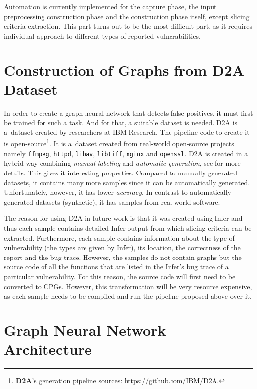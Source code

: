 Automation is currently implemented for the capture phase, the input preprocessing
construction phase and the construction phase itself, except slicing criteria
extraction. This part turns out to be the most difficult part, as it requires individual
approach to different types of reported vulnerabilities.


\section{Construction of Graphs from D2A Dataset}
\label{d2a}

In order to create a graph neural network that detects false positives, it must first be trained for such a task. And for that, a suitable dataset is needed. D2A \cite{D2A-zheng2021d2a} is a~dataset created by researchers at IBM Research. The pipeline code to create it is open-source\footnote{\textbf{D2A}'s generation pipeline sources: \url{https://github.com/IBM/D2A}.}. It is a~dataset created from real-world open-source projects \cite{D2A-webpage} namely \texttt{ffmpeg}, \texttt{httpd}, \texttt{libav}, \texttt{libtiff}, \texttt{nginx} and \texttt{openssl}. D2A is created in a hybrid way combining \textit{manual labeling} and \textit{automatic generation}, see \cite{D2A-zheng2021d2a} for more details. This gives it interesting properties. Compared to manually generated datasets, it contains many more samples since it can be automatically generated. Unfortunately, however, it has lower \textit{accuracy}. In contrast to automatically generated datasets (synthetic), it has samples from real-world software.

The reason for using D2A in future work is that it was created using Infer and thus each sample contains detailed Infer output from which slicing criteria can be extracted. Furthermore, each sample contains information about the type of vulnerability (the types are given by Infer), its location, the correctness of the report and the bug trace. However, the samples do not contain graphs but the source code of all the functions that are listed in the Infer's bug trace of a particular vulnerability. For this reason, the source code will first need to be converted to CPGs. However, this transformation will be very resource expensive, as each sample needs to be compiled and run the pipeline proposed above over it.


\section{Graph Neural Network Architecture}
\label{gnn-choice}

